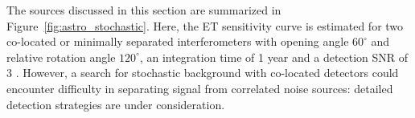 The sources discussed in this section are summarized in Figure~\ref{fig:astro_stochastic}.
Here, the ET sensitivity curve is estimated for two co-located or minimally 
separated interferometers with opening angle $60^\circ$ and relative rotation angle 
$120^\circ$, an integration time of 1 year and a detection SNR of 3 \cite{Allen:1997ad}. 
However, a search for stochastic background with co-located detectors could encounter 
difficulty in separating signal from correlated noise sources: detailed detection strategies 
are under consideration.

%
%

